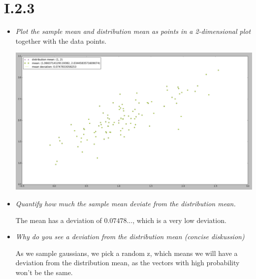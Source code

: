 \documentclass[12pt, a4paper]{article}
\begin{document}
\section{I.2.3}
\begin{itemize}
\item \textit{Plot the sample mean and distribution mean as points in a 2-dimensional plot}
together with the data points.

\includegraphics[width=\textwidth]{3.png}

\item \textit{Quantify how much the sample mean deviate from the distribution mean.}

The mean has a deviation of $0.07478...$, which is a very low deviation.

\item \textit{Why do you see a deviation from the distribution mean (concise diskussion)}

As we sample gaussians, we pick a random z, which means we will have a deviation from the distribution mean, as the vectors with high probability won't be the same.
\end{itemize}
\end{document}
